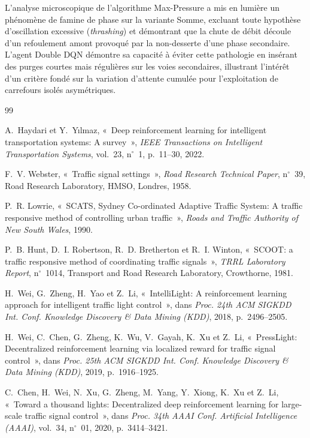 \documentclass[10pt,twocolumn,letterpaper]{article}
\begin{document}
L'analyse microscopique de l'algorithme Max-Pressure a mis en lumière un phénomène de famine de phase sur la variante Somme, excluant toute hypothèse d'oscillation excessive (\emph{thrashing}) et démontrant que la chute de débit découle d'un refoulement amont provoqué par la non-desserte d'une phase secondaire. L'agent Double DQN démontre sa capacité à éviter cette pathologie en insérant des purges courtes mais régulières sur les voies secondaires, illustrant l'intérêt d'un critère fondé sur la variation d'attente cumulée pour l'exploitation de carrefours isolés asymétriques.

\begin{thebibliography}{99}
\small
\setlength{\itemsep}{0.2em}

A.~Haydari et Y.~Y{\i}lmaz, «~Deep reinforcement learning for intelligent transportation systems: A survey~», \emph{IEEE Transactions on Intelligent Transportation Systems}, vol.~23, n$^\circ$~1, p.~11--30, 2022.

F.~V. Webster, «~Traffic signal settings~», \emph{Road Research Technical Paper}, n$^\circ$~39, Road Research Laboratory, HMSO, Londres, 1958.

P.~R. Lowrie, «~SCATS, Sydney Co-ordinated Adaptive Traffic System: A traffic responsive method of controlling urban traffic~», \emph{Roads and Traffic Authority of New South Wales}, 1990.

P.~B. Hunt, D.~I. Robertson, R.~D. Bretherton et R.~I. Winton, «~SCOOT: a traffic responsive method of coordinating traffic signals~», \emph{TRRL Laboratory Report}, n$^\circ$~1014, Transport and Road Research Laboratory, Crowthorne, 1981.

H.~Wei, G.~Zheng, H.~Yao et Z.~Li, «~IntelliLight: A reinforcement learning approach for intelligent traffic light control~», dans \emph{Proc. 24th ACM SIGKDD Int. Conf. Knowledge Discovery \& Data Mining (KDD)}, 2018, p.~2496--2505.

H.~Wei, C.~Chen, G.~Zheng, K.~Wu, V.~Gayah, K.~Xu et Z.~Li, «~PressLight: Decentralized reinforcement learning via localized reward for traffic signal control~», dans \emph{Proc. 25th ACM SIGKDD Int. Conf. Knowledge Discovery \& Data Mining (KDD)}, 2019, p.~1916--1925.

C.~Chen, H.~Wei, N.~Xu, G.~Zheng, M.~Yang, Y.~Xiong, K.~Xu et Z.~Li, «~Toward a thousand lights: Decentralized deep reinforcement learning for large-scale traffic signal control~», dans \emph{Proc. 34th AAAI Conf. Artificial Intelligence (AAAI)}, vol.~34, n$^\circ$~01, 2020, p.~3414--3421.


\end{thebibliography}
\end{document}
